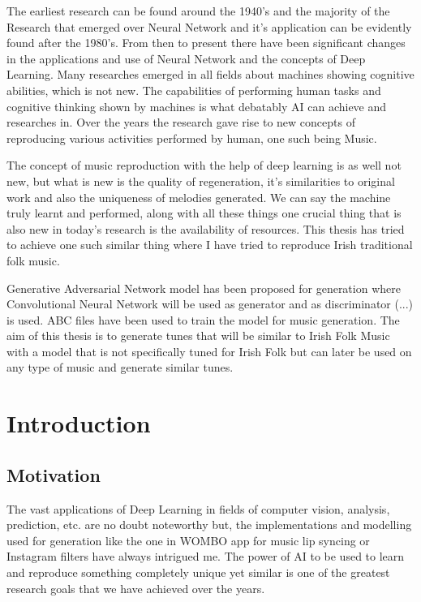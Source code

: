 \documentclass[oneside,12pt]{Classes/RoboticsLaTeX}
\begin{document}
\begin{abstracts}

The earliest research can be found around the 1940's and the majority of the Research that emerged over Neural Network and it's application can be evidently found after the 1980's. From then to present there have been significant changes in the applications and use of Neural Network and the concepts of Deep Learning. Many researches emerged in all fields about machines showing cognitive abilities, which is not new. The capabilities of performing human tasks and cognitive thinking  shown by machines is what debatably AI can achieve and researches in. Over the years the research gave rise to new concepts of reproducing various activities performed by human, one such being Music.

The concept of music reproduction with the help of deep learning is as well not new, but what is new is the quality of regeneration, it's similarities to original work and also the uniqueness of melodies generated. We can say the machine truly learnt and performed, along with all these things one crucial thing that is also new in today's research is the availability of resources. This thesis has tried to achieve one such similar thing where I have tried to reproduce Irish traditional folk music.

Generative Adversarial Network model has been proposed for generation where Convolutional Neural Network will be used as generator and as discriminator (...) is used. ABC files have been used to train the model for music generation. The aim of this thesis is to generate tunes that will be similar to Irish Folk Music with a model that is not specifically tuned for Irish Folk but can later be used on any type of music and generate similar tunes.

\end{abstracts}


\tableofcontents
\listoffigures

\mainmatter

\chapter{Introduction}
\label{chap:introduction}
\section{Motivation}

The vast applications of Deep Learning in fields of computer vision, analysis, prediction, etc. are no doubt noteworthy but, the implementations and modelling used for generation like the one in WOMBO app for music lip syncing or Instagram filters have always intrigued me. The power of AI to be used to learn and reproduce something completely unique yet similar is one of the greatest research goals that we have achieved over the years.
\end{document}
